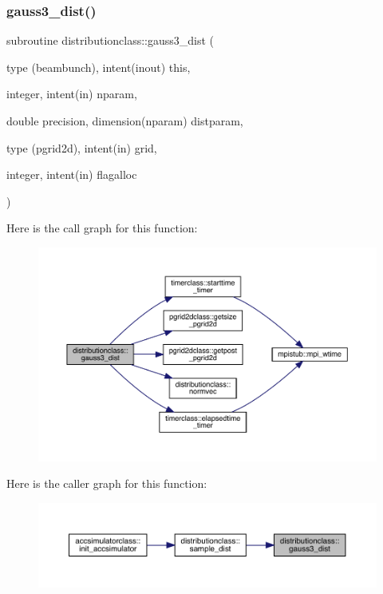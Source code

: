 \subsubsection{\texorpdfstring{gauss3\_dist()}{gauss3\_dist()}}
{\footnotesize\ttfamily subroutine distributionclass\+::gauss3\+\_\+dist (\begin{DoxyParamCaption}\item[{type (beambunch), intent(inout)}]{this,  }\item[{integer, intent(in)}]{nparam,  }\item[{double precision, dimension(nparam)}]{distparam,  }\item[{type (pgrid2d), intent(in)}]{grid,  }\item[{integer, intent(in)}]{flagalloc }\end{DoxyParamCaption})}

Here is the call graph for this function\+:\nopagebreak
\begin{figure}[H]
\begin{center}
\leavevmode
\includegraphics[width=350pt]{namespacedistributionclass_af85f956a3fdb677022a546bc69ecfb3c_cgraph}
\end{center}
\end{figure}
Here is the caller graph for this function\+:\nopagebreak
\begin{figure}[H]
\begin{center}
\leavevmode
\includegraphics[width=350pt]{namespacedistributionclass_af85f956a3fdb677022a546bc69ecfb3c_icgraph}
\end{center}
\end{figure}
\mbox{\label{namespacedistributionclass_ae3590d26a730b67c67e6e6597196f4bd}} 
